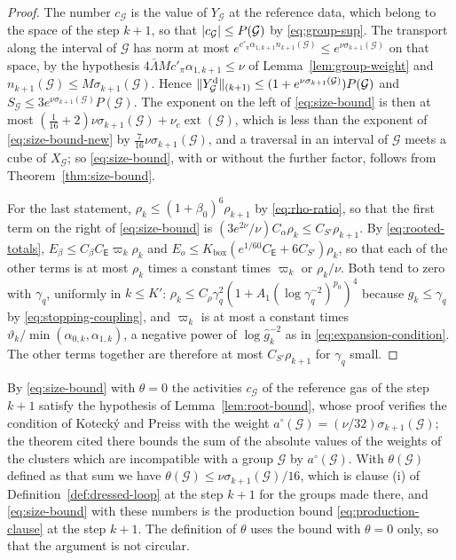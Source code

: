 \documentclass[11pt]{preprint}
\DeclarePairedDelimiter{\abs}{\lvert}{\rvert}
\DeclarePairedDelimiter{\norm}{\lVert}{\rVert}
\numberwithin{equation}{section}
\theoremstyle{definition}
\theoremstyle{remark}
\theoremstyle{plain}
\begin{document}
\begin{proof}
The number $c_{\mathcal G}$ is the value of $Y_{\mathcal G}$ at the reference data, which belong to the space of the step $k + 1$, so that $\abs{c_{\mathcal G}} \leq P(\mathcal G)$ by \eqref{eq:group-sup}. The transport along the interval of $\mathcal G$ has norm at most $e^{c'_\pi\alpha_{1,k+1}n_{k+1}(\mathcal G)} \leq e^{\nu\sigma_{k+1}(\mathcal G)}$ on that space, by the hypothesis $4\bar\Lambda Mc'_\pi\alpha_{1,k+1} \leq \nu$ of Lemma~\ref{lem:group-weight} and $n_{k+1}(\mathcal G) \leq M\sigma_{k+1}(\mathcal G)$. Hence $\norm{Y^{\mathrm d}_{\mathcal G}}_{(k+1)} \leq (1 + e^{\nu\sigma_{k+1}(\mathcal G)})P(\mathcal G)$ and $S_{\mathcal G} \leq 3e^{\nu\sigma_{k+1}(\mathcal G)}P(\mathcal G)$. The exponent on the left of \eqref{eq:size-bound} is then at most $(\frac{1}{16} + 2)\nu\sigma_{k+1}(\mathcal G) + \nu_e\operatorname{ext}(\mathcal G)$, which is less than the exponent of \eqref{eq:size-bound-new} by $\frac{7}{16}\nu\sigma_{k+1}(\mathcal G)$, and a traversal in an interval of $\mathcal G$ meets a cube of $X_{\mathcal G}$; so \eqref{eq:size-bound}, with or without the further factor, follows from Theorem~\ref{thm:size-bound}.

For the last statement, $\rho_k \leq (1 + \beta_0)^6\rho_{k+1}$ by \eqref{eq:rho-ratio}, so that the first term on the right of \eqref{eq:size-bound} is $(3e^{2\nu}/\nu)C_\alpha\rho_k \leq C_{S'}\rho_{k+1}$. By \eqref{eq:rooted-totals}, $E_\beta \leq C_\beta C_{\mathsf E}\varpi_k\rho_k$ and $E_o \leq K_{\mathrm{box}}(e^{1/60}C_{\mathsf E} + 6C_{S'})\rho_k$, so that each of the other terms is at most $\rho_k$ times a constant times $\varpi_k$ or $\rho_k/\nu$. Both tend to zero with $\gamma_q$, uniformly in $k \leq K'$: $\rho_k \leq C_\rho\gamma_q^2(1 + A_1(\log\gamma_q^{-2})^{p_0})^4$ because $g_k \leq \gamma_q$ by \eqref{eq:stopping-coupling}, and $\varpi_k$ is at most a constant times $\vartheta_k/\min(\alpha_{0,k}, \alpha_{1,k})$, a negative power of $\log\hat g_k^{-2}$ as in \eqref{eq:expansion-condition}. The other terms together are therefore at most $C_{S'}\rho_{k+1}$ for $\gamma_q$ small.
\end{proof}

By \eqref{eq:size-bound} with $\theta = 0$ the activities $c_{\mathcal G}$ of the reference gas of the step $k + 1$ satisfy the hypothesis of Lemma~\ref{lem:root-bound}, whose proof verifies the condition of Koteck\'y and Preiss with the weight $a^\circ(\mathcal G) = (\nu/32)\sigma_{k+1}(\mathcal G)$; the theorem cited there bounds the sum of the absolute values of the weights of the clusters which are incompatible with a group $\mathcal G$ by $a^\circ(\mathcal G)$. With $\theta(\mathcal G)$ defined as that sum we have $\theta(\mathcal G) \leq \nu\sigma_{k+1}(\mathcal G)/16$, which is clause (i) of Definition~\ref{def:dressed-loop} at the step $k + 1$ for the groups made there, and \eqref{eq:size-bound} with these numbers is the production bound \eqref{eq:production-clause} at the step $k + 1$. The definition of $\theta$ uses the bound with $\theta = 0$ only, so that the argument is not circular.
\end{document}
